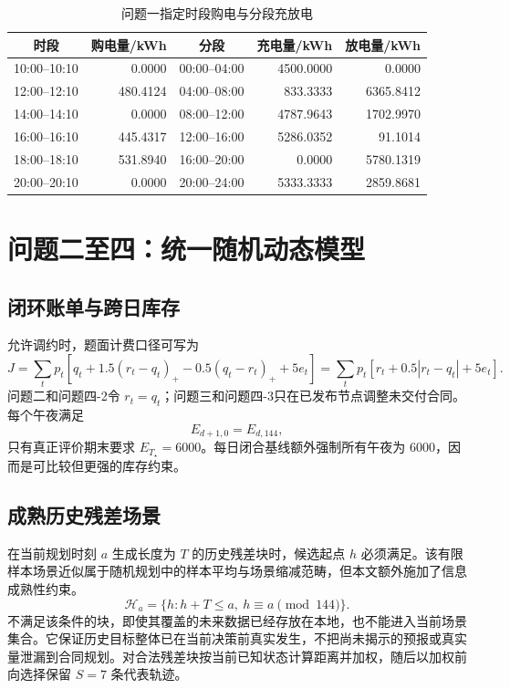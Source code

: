 \documentclass[UTF8,a4paper,zihao=-4,fontset=mac]{ctexart}
\newcommand{\pos}[1]{\left(#1\right)_+}
\begin{document}
\begin{table}[H]\centering\small
\caption{问题一指定时段购电与分段充放电}
\begin{tabular}{c|r@{\quad}c|r r}
\toprule
时段 & 购电量/kWh & 分段 & 充电量/kWh & 放电量/kWh\\\midrule
10:00--10:10 & 0.0000 & 00:00--04:00 & 4500.0000 & 0.0000\\
12:00--12:10 & 480.4124 & 04:00--08:00 & 833.3333 & 6365.8412\\
14:00--14:10 & 0.0000 & 08:00--12:00 & 4787.9643 & 1702.9970\\
16:00--16:10 & 445.4317 & 12:00--16:00 & 5286.0352 & 91.1014\\
18:00--18:10 & 531.8940 & 16:00--20:00 & 0.0000 & 5780.1319\\
20:00--20:10 & 0.0000 & 20:00--24:00 & 5333.3333 & 2859.8681\\
\bottomrule
\end{tabular}
\end{table}

\section{问题二至四：统一随机动态模型}
\subsection{闭环账单与跨日库存}
允许调约时，题面计费口径可写为
\begin{equation}\label{eq:bill}
J=\sum_t p_t\left[q_t+1.5\pos{r_t-q_t}-0.5\pos{q_t-r_t}+5e_t\right]
=\sum_t p_t\left[r_t+0.5|r_t-q_t|+5e_t\right].
\end{equation}
问题二和问题四-2令 $r_t=q_t$；问题三和问题四-3只在已发布节点调整未交付合同。每个午夜满足
\begin{equation}
E_{d+1,0}=E_{d,144},
\end{equation}
只有真正评价期末要求 $E_{T_\star}=6000$。每日闭合基线额外强制所有午夜为 $6000$，因而是可比较但更强的库存约束。

\subsection{成熟历史残差场景}
在当前规划时刻 $a$ 生成长度为 $T$ 的历史残差块时，候选起点 $h$ 必须满足。该有限样本场景近似属于随机规划中的样本平均与场景缩减范畴\cite{shapiro,kl,scenario}，但本文额外施加了信息成熟性约束。
\begin{equation}
\mathcal H_a=\{h:h+T\le a,\ h\equiv a\pmod {144}\}.
\end{equation}
不满足该条件的块，即使其覆盖的未来数据已经存放在本地，也不能进入当前场景集合。它保证历史目标整体已在当前决策前真实发生，不把尚未揭示的预报或真实量泄漏到合同规划。对合法残差块按当前已知状态计算距离并加权，随后以加权前向选择保留 $S=7$ 条代表轨迹。
\end{document}
